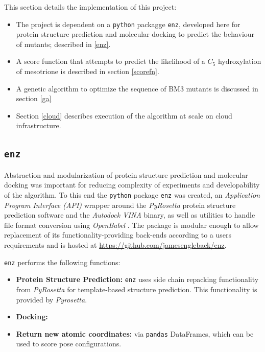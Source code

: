 \documentclass[16pt]{article}
\begin{document}
This section details the implementation of this project:
\begin{itemize}
	\item The project is dependent on a \texttt{python} packagge \texttt{enz}, developed here for protein structure prediction and molecular docking to predict the behaviour of mutants; described in \ref{enz}.
	\item A score function that attempts to predict the likelihood of a $C_5$ hydroxylation of mesotrione is described in section \ref{scorefn}.
	\item A genetic algorithm to optimize the sequence of BM3 mutants is discussed in section \ref{ga} 
	\item Section \ref{cloud} describes execution of the algorithm at scale on cloud infrastructure.
\end{itemize}


\subsection{\texttt{enz} \label{enz}}

Abstraction and modularization of protein structure prediction and molecular docking was important for reducing complexity of experiments and developability of the algorithm.
To this end the \texttt{python} package \texttt{enz} was created, an \textit{Application Program Interface (API)} wrapper around the \textit{PyRosetta} \cite{chaudhury2010pyrosetta} protein structure prediction software and the \textit{Autodock VINA} \cite{trott2010autodock} binary, as well as utilities to handle file format conversion using \textit{OpenBabel} \cite{o2011open}.
The package is modular enough to allow replacement of its functionality-providing back-ends according to a users requirements and is hosted at \href{https://github.com/jamesengleback/enz}{https://github.com/jamesengleback/enz}.

\texttt{enz} performs the following functions:
\begin{itemize}
	\item \textbf{Protein Structure Prediction:} \texttt{enz} uses side chain repacking \cite{dunbrack1993backbone} functionality from \textit{PyRosetta} for template-based structure prediction. 
		This functionality is provided by \textit{Pyrosetta}.
	\item \textbf{Docking:}
	\item \textbf{Return new atomic coordinates:} via \texttt{pandas} DataFrames, which can be used to score pose configurations.
\end{itemize}
\end{document}
